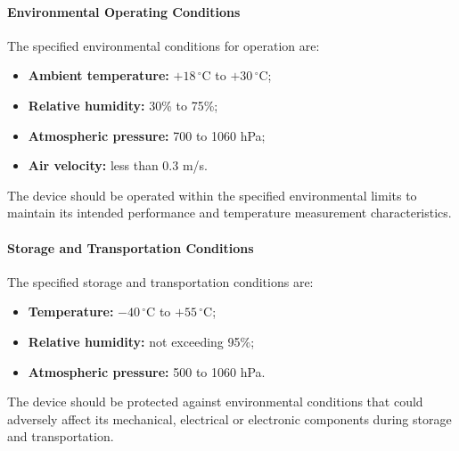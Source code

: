 \paragraph{Environmental Operating Conditions}

The specified environmental conditions for operation are:

\begin{itemize}
    \item \textbf{Ambient temperature:}
    $+18\,^{\circ}\mathrm{C}$ to $+30\,^{\circ}\mathrm{C}$;
    \item \textbf{Relative humidity:} 30\% to 75\%;
    \item \textbf{Atmospheric pressure:} 700 to 1060 hPa;
    \item \textbf{Air velocity:} less than 0.3 m/s.
\end{itemize}

The device should be operated within the specified environmental
limits to maintain its intended performance and temperature
measurement characteristics.


\paragraph{Storage and Transportation Conditions}

The specified storage and transportation conditions are:

\begin{itemize}
    \item \textbf{Temperature:}
    $-40\,^{\circ}\mathrm{C}$ to $+55\,^{\circ}\mathrm{C}$;
    \item \textbf{Relative humidity:} not exceeding 95\%;
    \item \textbf{Atmospheric pressure:} 500 to 1060 hPa.
\end{itemize}

The device should be protected against environmental conditions
that could adversely affect its mechanical, electrical or
electronic components during storage and transportation.


